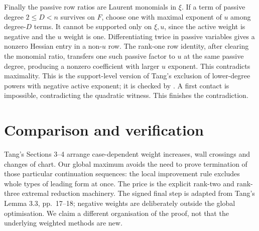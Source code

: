 \documentclass[11pt,a4paper]{article}
\begin{document}
Finally the passive row ratios are Laurent monomials in $\xi$. If a term of passive degree $2\le D<n$ survives on $F$, choose one with maximal exponent of $u$ among degree-$D$ terms. It cannot be supported only on $\xi,u$, since the active weight is negative and the $u$ weight is one. Differentiating twice in passive variables gives a nonzero Hessian entry in a non-$u$ row. The rank-one row identity, after clearing the monomial ratio, transfers one such passive factor to $u$ at the same passive degree, producing a nonzero coefficient with larger $u$ exponent. This contradicts maximality. This is the support-level version of Tang's exclusion of lower-degree powers with negative active exponent; it is checked by . A first contact is impossible, contradicting the quadratic witness. This finishes the contradiction.

\section*{Comparison and verification}
Tang's Sections 3--4 \cite{tang} arrange case-dependent weight increases, wall crossings and changes of chart. Our global maximum avoids the need to prove termination of those particular continuation sequences: the local improvement rule excludes whole types of leading form at once. The price is the explicit rank-two and rank-three extremal reduction machinery. The signed final step is adapted from Tang's Lemma 3.3, pp.~17--18; negative weights are deliberately outside the global optimisation. We claim a different organisation of the proof, not that the underlying weighted methods are new.
\end{document}
